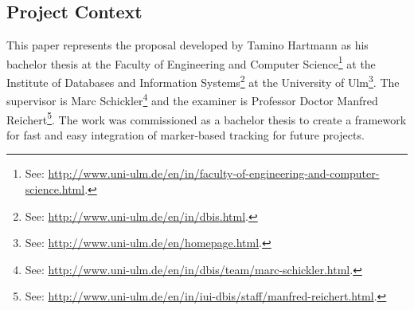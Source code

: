 \subsection{Project Context}

This paper represents the proposal developed by Tamino Hartmann as his bachelor thesis at the Faculty of Engineering and Computer Science\footnote{See: \url{http://www.uni-ulm.de/en/in/faculty-of-engineering-and-computer-science.html}.} at the Institute of Databases and Information Systems\footnote{See: \url{http://www.uni-ulm.de/en/in/dbis.html}.} at the University of Ulm\footnote{See: \url{http://www.uni-ulm.de/en/homepage.html}.}.
The supervisor is Marc Schickler\footnote{See: \url{http://www.uni-ulm.de/en/in/dbis/team/marc-schickler.html}.} and the examiner is Professor Doctor Manfred Reichert\footnote{See: \url{http://www.uni-ulm.de/en/in/iui-dbis/staff/manfred-reichert.html}.}.
The work was commissioned as a bachelor thesis to create a framework for fast and easy integration of marker-based tracking for future projects.
